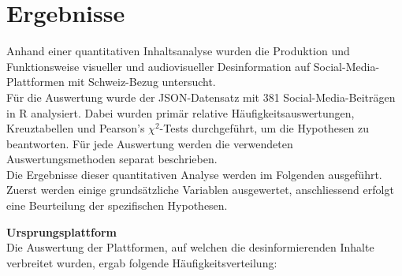 \documentclass[12pt,a4paper]{article}        %
\begin{document}
\pagebreak
\section{Ergebnisse}
Anhand einer quantitativen Inhaltsanalyse wurden die Produktion und Funktionsweise visueller und audiovisueller Desinformation auf Social-Media-Plattformen mit Schweiz-Bezug untersucht.\\
Für die Auswertung wurde der JSON-Datensatz mit 381 Social-Media-Beiträgen in R analysiert. Dabei wurden primär relative Häufigkeitsauswertungen, Kreuztabellen und Pearson’s \(\chi^2\)-Tests durchgeführt, um die Hypothesen zu beantworten. Für jede Auswertung werden die verwendeten Auswertungsmethoden separat beschrieben.\\ Die Ergebnisse dieser quantitativen Analyse werden im Folgenden ausgeführt. Zuerst werden einige grundsätzliche Variablen ausgewertet, anschliessend erfolgt eine Beurteilung der spezifischen Hypothesen.

\textbf{Ursprungsplattform}\\
Die Auswertung der Plattformen, auf welchen die desinformierenden Inhalte verbreitet wurden, ergab folgende Häufigkeitsverteilung:

\begin{table}[H]
  \label{tab:results_origin_platform}
  \centering
  \caption{Relative Häufigkeitsverteilung der Ursprungsplattformen der desinformierenden Beiträge in \%.}
\end{table}
\end{document}
